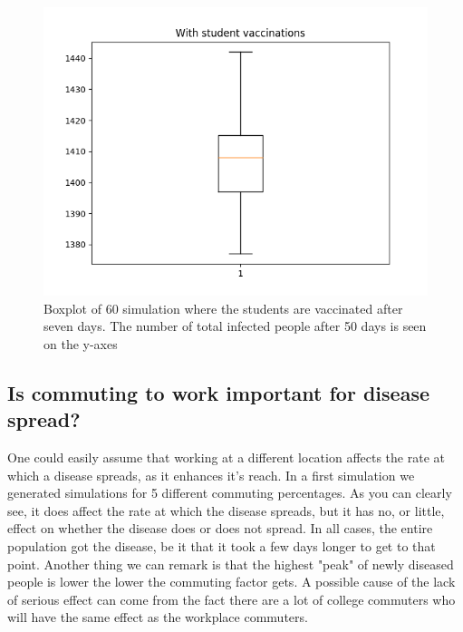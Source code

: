 \documentclass[runningheads]{llncs}
\begin{document}
\begin{figure}[h!]
	\includegraphics[width=\textwidth]{vax_campus_2.png}
	\caption{Boxplot of 60 simulation where the students are vaccinated after seven days. The number of total infected people after 50 days is seen on the y-axes}
	\label{vax_campus}
\end{figure}
\newpage

\subsection{Is commuting to work important for disease spread?}
One could easily assume that working at a different location affects the rate at which a disease spreads, as it enhances it's reach. In a first simulation we generated simulations for 5 different commuting percentages. As you can clearly see, it does affect the rate at which the disease spreads, but it has no, or little, effect on whether the disease does or does not spread. In all cases, the entire population got the disease, be it that it took a few days longer to get to that point. Another thing we can remark is that the highest "peak" of newly diseased people is lower the lower the commuting factor gets. A possible cause of the lack of serious effect can come from the fact there are a lot of college commuters who will have the same effect as the workplace commuters. 
\end{document}
